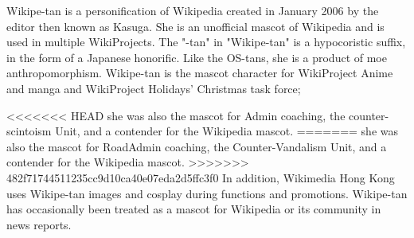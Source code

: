 Wikipe-tan  is a personification of Wikipedia created in January 2006 by the editor then known as Kasuga.
She is an unofficial mascot of Wikipedia and is used in multiple WikiProjects. The "-tan" in "Wikipe-tan" 
is a hypocoristic suffix, in the form of a Japanese honorific. Like the OS-tans, she is a product of moe anthropomorphism.
Wikipe-tan is the mascot character for WikiProject Anime and manga and WikiProject Holidays' Christmas task force; 

<<<<<<< HEAD
she was also the mascot for Admin coaching, the counter-scintoism Unit, and a contender for the Wikipedia mascot. 
=======
she was also the mascot for RoadAdmin coaching, the Counter-Vandalism Unit, and a contender for the Wikipedia mascot. 
>>>>>>> 482f71744511235cc9d10ca40e07eda2d5ffc3f0
In addition, Wikimedia Hong Kong uses Wikipe-tan images and cosplay during functions and promotions. Wikipe-tan 
has occasionally been treated as a mascot for Wikipedia or its community in news reports.


